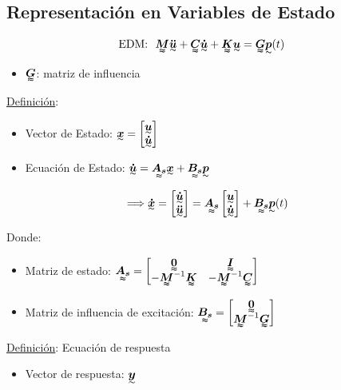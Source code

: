 \subsection{Representación en Variables de Estado}
\begin{align*}
    \text{EDM: }~\tenq{M}\tend{\ddot{u}}+\tenq{C}\tend{\dot{u}}+\tenq{K}\tend{u}&=\tenq{G}\tend{p}(t) 
\end{align*}
\begin{itemize}
    \item $\tenq{G}$: matriz de influencia
\end{itemize}

\underline{Definición}: 
\begin{itemize}
    \item Vector de Estado: $\tend{x}=\begin{bmatrix}\tend{u}\\ \tend{\dot{u}}\end{bmatrix}$
    \item Ecuación de Estado: $\tend{\dot{u}}=\tenq{A_s}\tend{x}+\tenq{B_s}\tend{p}$
\end{itemize}

\begin{align*}
    \Longrightarrow \tend{\dot{x}}=\begin{bmatrix}\tend{\dot{u}}\\ \tend{\ddot{u}}\end{bmatrix}=\tenq{A_s}\begin{bmatrix}\tend{u}\\ \tend{\dot{u}}\end{bmatrix}+\tenq{B_s}\tend{p}(t)
\end{align*}

Donde:
\begin{itemize}
    \item Matriz de estado: $\tenq{A_s}=\begin{bmatrix}\tenq{0} & \tenq{I}\\ -\tenq{M}^{-1}\tenq{K} & -\tenq{M}^{-1}\tenq{C}\end{bmatrix}$
    \item Matriz de influencia de excitación: $\tenq{B_s}=\begin{bmatrix}\tenq{0}\\ \tenq{M}^{-1}\tenq{G}\end{bmatrix}$
\end{itemize}

\underline{Definición}: Ecuación de respuesta\\
\begin{itemize}
    \item Vector de respuesta: $\tend{y}$
\end{itemize}

